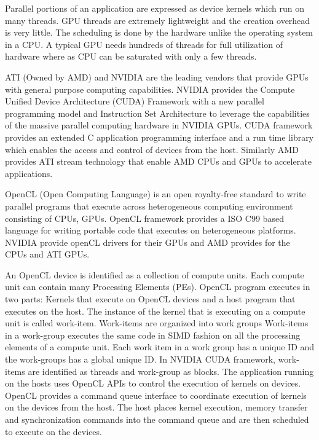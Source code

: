 \documentclass[conference]{IEEEtran}
\begin{document}
Parallel portions of an application are expressed as device kernels which run on many threads. GPU threads are extremely lightweight and the creation overhead is very little. The scheduling is done by the hardware unlike the operating system in a CPU. A typical GPU needs hundreds of threads for full utilization of hardware where as CPU can be saturated with only a few threads.

ATI (Owned by AMD) and NVIDIA are the leading vendors that provide GPUs with general purpose computing capabilities. NVIDIA provides the Compute Unified Device Architecture (CUDA) Framework with a new parallel programming model and Instruction Set Architecture to leverage the capabilities of the massive parallel computing hardware in NVIDIA GPUs. CUDA framework provides an extended C application programming interface and a run time library which enables the access and control of devices from the host. Similarly AMD provides ATI stream technology that enable AMD CPUs and GPUs to accelerate applications.

OpenCL (Open Computing Language) is an open royalty-free standard to write parallel programs that execute across heterogeneous computing environment consisting of CPUs, GPUs. OpenCL framework provides a ISO C99 based language for writing portable code that executes on heterogeneous platforms. NVIDIA provide openCL drivers for their GPUs and AMD provides for the CPUs and ATI GPUs.

An OpenCL device is identified as a collection of compute units. Each compute unit can contain many Processing Elements (PEs). OpenCL program executes in two parts: Kernels that execute on OpenCL devices and a host program that executes on the host. The instance of the kernel that is executing on a compute unit is called work-item. Work-items are organized into work groups Work-items in a work-group executes the same code in SIMD fashion on all the processing elements of a compute unit. Each work item in a work group has a unique ID and the work-groups has a global unique ID. In NVIDIA CUDA framework, work-items are identified as threads and work-group as blocks. The application running on the hosts uses OpenCL APIs to control the execution of kernels on devices. OpenCL provides a command queue interface to coordinate execution of kernels on the devices from the host. The host places kernel execution, memory transfer and synchronization commands into the command queue and are then scheduled to execute on the devices.
\end{document}
